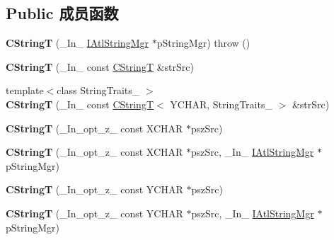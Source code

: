 \subsection*{Public 成员函数}
\begin{DoxyCompactItemize}
\item 
\mbox{\label{class_a_t_l_1_1_c_string_t_a5850bafa1c5db417d87e78c8e4fa5f7e}} 
{\bfseries C\+StringT} (\+\_\+\+In\+\_\+ \hyperlink{class_a_t_l_1_1_i_atl_string_mgr}{I\+Atl\+String\+Mgr} $\ast$p\+String\+Mgr)  throw ()
\item 
\mbox{\label{class_a_t_l_1_1_c_string_t_a61be04875343e97adc18093b5a609678}} 
{\bfseries C\+StringT} (\+\_\+\+In\+\_\+ const \hyperlink{class_a_t_l_1_1_c_string_t}{C\+StringT} \&str\+Src)
\item 
\mbox{\label{class_a_t_l_1_1_c_string_t_a26c68cf86b1c848302092ffb4e1a7a22}} 
{\footnotesize template$<$class String\+Traits\+\_\+ $>$ }\\{\bfseries C\+StringT} (\+\_\+\+In\+\_\+ const \hyperlink{class_a_t_l_1_1_c_string_t}{C\+StringT}$<$ Y\+C\+H\+AR, String\+Traits\+\_\+ $>$ \&str\+Src)
\item 
\mbox{\label{class_a_t_l_1_1_c_string_t_a997e174ed391b50ca445e7ca87cd5bd9}} 
{\bfseries C\+StringT} (\+\_\+\+In\+\_\+opt\+\_\+z\+\_\+ const X\+C\+H\+AR $\ast$psz\+Src)
\item 
\mbox{\label{class_a_t_l_1_1_c_string_t_a90f390078b0605352ec3bbb9c5f3e44d}} 
{\bfseries C\+StringT} (\+\_\+\+In\+\_\+opt\+\_\+z\+\_\+ const X\+C\+H\+AR $\ast$psz\+Src, \+\_\+\+In\+\_\+ \hyperlink{class_a_t_l_1_1_i_atl_string_mgr}{I\+Atl\+String\+Mgr} $\ast$p\+String\+Mgr)
\item 
\mbox{\label{class_a_t_l_1_1_c_string_t_a47cc14bfacd11bbb1d0bf21d1b476a6c}} 
{\bfseries C\+StringT} (\+\_\+\+In\+\_\+opt\+\_\+z\+\_\+ const Y\+C\+H\+AR $\ast$psz\+Src)
\item 
\mbox{\label{class_a_t_l_1_1_c_string_t_ad9b36640363dfd89cb6a8d5d1e144d28}} 
{\bfseries C\+StringT} (\+\_\+\+In\+\_\+opt\+\_\+z\+\_\+ const Y\+C\+H\+AR $\ast$psz\+Src, \+\_\+\+In\+\_\+ \hyperlink{class_a_t_l_1_1_i_atl_string_mgr}{I\+Atl\+String\+Mgr} $\ast$p\+String\+Mgr)

\end{DoxyCompactItemize}
